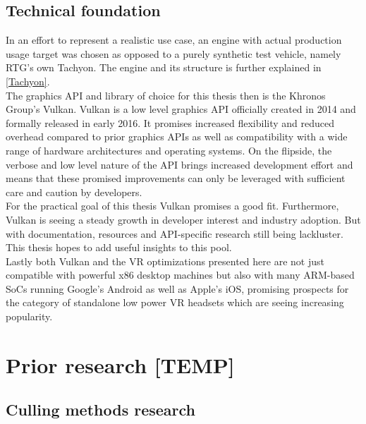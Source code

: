\section{Technical foundation}
In an effort to represent a realistic use case, an engine with actual production usage target was chosen as opposed to a purely synthetic test vehicle, namely \gls{RTG}'s own \gls{Tachyon}. The engine and its structure is further explained in \autoref{Tachyon}. \\
The graphics API and library of choice for this thesis then is the Khronos Group's Vulkan. Vulkan is a low level graphics API officially created in 2014 and formally released in early 2016. It promises increased flexibility and reduced overhead compared to prior graphics APIs as well as compatibility with a wide range of hardware architectures and operating systems\cite{TheKhronosGroupInc..2016}. On the flipside, the verbose and low level nature of the API brings increased development effort and means that these promised improvements can only be leveraged with sufficient care and caution by developers. \\
For the practical goal of this thesis Vulkan promises a good fit. Furthermore, Vulkan is seeing a steady growth in developer interest and industry adoption. But with documentation, resources and API-specific research still being lackluster. This thesis hopes to add useful insights to this pool. \\
Lastly both Vulkan and the \gls{VR} optimizations presented here are not just compatible with powerful x86 desktop machines but also with many ARM-based SoCs running Google's Android as well as Apple's iOS, promising prospects for the category of standalone low power \gls{VR} headsets which are seeing increasing popularity\cite{AntonyVitillo.2018}\cite{IDCCorporateUSA.2020}. 



\iffalse
\chapter{Prior research [TEMP]}\label{chapter:introduction}

\section{Culling methods research}
